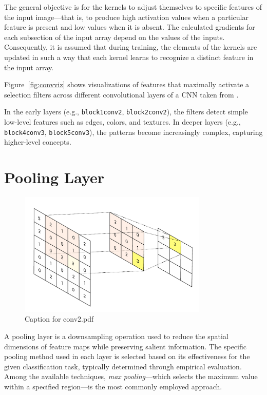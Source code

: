 \documentclass{pracalicmgr}
\begin{document}
The general objective is for the kernels to adjust themselves to specific features of the input image—that is, to produce high activation values when a particular feature is present and low values when it is absent. The calculated gradients for each subsection of the input array depend on the values of the inputs. Consequently, it is assumed that during training, the elements of the kernels are updated in such a way that each kernel learns to recognize a distinct feature in the input array.

Figure~\ref{fig:convviz} shows visualizations of features that maximally activate a selection filters across different convolutional layers of a CNN taken from \cite{activations}.

In the early layers (e.g., \texttt{block1conv2}, \texttt{block2conv2}), the filters detect simple low-level features such as edges, colors, and textures. In deeper layers (e.g., \texttt{block4conv3}, \texttt{block5conv3}), the patterns become increasingly complex, capturing higher-level concepts.

\section{Pooling Layer}

\begin{figure}[H]
    \centering
    \includegraphics[width=0.8\textwidth]{src/pool1.pdf}
    \caption{Caption for conv2.pdf}
\end{figure}

A pooling layer is a downsampling operation used to reduce the spatial dimensions of feature maps while preserving salient information. The specific pooling method used in each layer is selected based on its effectiveness for the given classification task, typically determined through empirical evaluation. Among the available techniques, \textit{max pooling}—which selects the maximum value within a specified region—is the most commonly employed approach.
\end{document}
